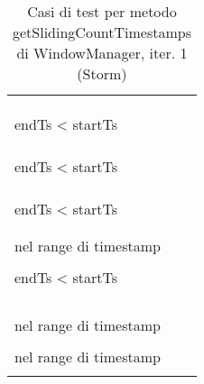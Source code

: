 \documentclass[10pt, a4paper]{article}
\newcommand{\Intmaketable}[4]{
	\begin{longtable}{#3}
	#4
	\caption{#2}
	\label{#1}
	\end{longtable}
}
\newcommand{\Inttestctable}[3]{
	\Intmaketable{#1}{#2}{|l|l|l|}{
	\hline
	\thead{Input} & \thead{Esito atteso} & \thead{Motivazione}\\
	\hline
	\hline
	#3
	\hline}
}
\newcommand{\Inttestccaption}[4]{Casi di test per metodo #1 di #2, iter. #3 (#4)}
\newcommand{\gettablelabel}[5]{table:#1:#2:#3:iter#4:proj#5}
\newcommand{\testctable}[5]{
	\Inttestctable{\gettablelabel{testc}{#1}{#2}{#3}{#4}}
		{\Inttestccaption{#1}{#2}{#3}{#4}}
		{#5}
}
\newcommand{\tcell}{\makecell[tl]}
\newcommand{\newtrow}{\\ \hline}
\def\storm{Storm}
\begin{document}
	\testctable{getSlidingCountTimestamps}{WindowManager}{1}{\storm}{
			\tcell{-1,-1,0} &
			\tcell{IllegalArgumentException viene lanciata} &
			\tcell{startTs, endTs e slidingCount $\le$ 0}
		\newtrow
			\tcell{-1,0,0} &
			\tcell{IllegalArgumentException viene lanciata} &
			\tcell{startTs e slidingCount $\le$ 0}
		\newtrow
			\tcell{-1,-2,0} &
			\tcell{IllegalArgumentException viene lanciata} &
			\tcell{startTs, endTs e slidingCount $\le$ 0,\\ endTs < startTs}
		\newtrow
			\tcell{-1,-1,1} &
			\tcell{IllegalArgumentException viene lanciata} &
			\tcell{startTs e endTs < 0}
		\newtrow
			\tcell{-1,0,1} &
			\tcell{IllegalArgumentException viene lanciata} &
			\tcell{startTs < 0}
		\newtrow
			\tcell{-1,-2,1} &
			\tcell{IllegalArgumentException viene lanciata} &
			\tcell{startTs e endTs < 0,\\ endTs < startTs}
		\newtrow
			\tcell{0,0,0} &
			\tcell{IllegalArgumentException viene lanciata} &
			\tcell{slidingCount $\le$ 0}
		\newtrow
			\tcell{0,1,0} &
			\tcell{IllegalArgumentException viene lanciata} &
			\tcell{slidingCount $\le$ 0}
		\newtrow
			\tcell{0,-1,0} &
			\tcell{IllegalArgumentException viene lanciata} &
			\tcell{endTs e slidingCount $\le$ 0,\\ endTs < startTs}
		\newtrow
			\tcell{0,0,1} &
			\tcell{Ritorno lista di timestamp vuota} &
			\tcell{endTs = startTs}
		\newtrow
			\tcell{0,1,1} &
			\tcell{Ritorno lista di timestamp vuota} &
			\tcell{Nessun evento ricade\\ nel range di timestamp}
		\newtrow
			\tcell{0,-1,1} &
			\tcell{IllegalArgumentException viene lanciata} &
			\tcell{endTs < 0,\\ endTs < startTs}
		\newtrow
			\tcell{$t(e_1)$, $t(e_1)$, $0$} &
			\tcell{IllegalArgumentException viene lanciata} &
			\tcell{slidingCount $\le$ 0}
		\newtrow
			\tcell{$t(e_1)$, $t(e_1)+1$, $0$} &
			\tcell{IllegalArgumentException viene lanciata} &
			\tcell{slidingCount $\le$ 0}
		\newtrow
			\tcell{$t(e_1)$, $t(e_1)-1$, $0$} &
			\tcell{IllegalArgumentException viene lanciata} &
			\tcell{slidingCount $\le$ 0}
		\newtrow
			\tcell{$t(e_1)$, $t(e_1)$, $1$} &
			\tcell{Ritorno lista di timestamp: $\{e_1\}$} &
			\tcell{L'evento $e_1$ ricade\\nel range di timestamp}
		\newtrow
			\tcell{$t(e_1)$, $t(e_1)+1$, $1$} &
			\tcell{Ritorno lista di timestamp: $\{e_1\}$} &
			\tcell{L'evento $e_1$ ricade\\nel range di timestamp}
		\newtrow
			\tcell{$t(e_1)$, $t(e_1)-1$, $1$} &
}
\end{document}
